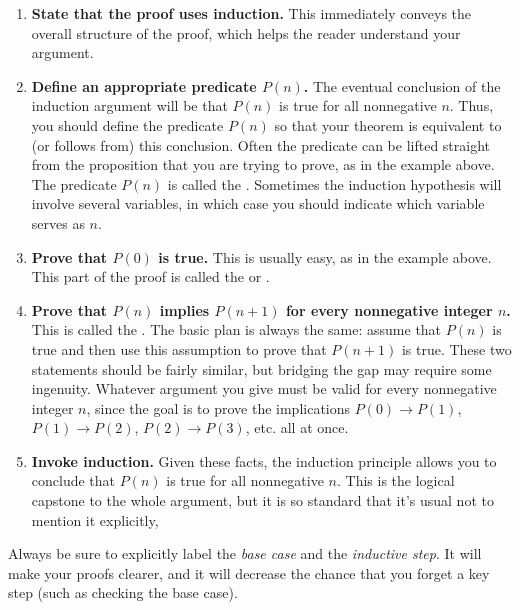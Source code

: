 \begin{enumerate}

\item \textbf{State that the proof uses induction.}  This immediately
conveys the overall structure of the proof, which helps the reader
understand your argument.

\item \textbf{Define an appropriate predicate $P(n)$.}  The eventual
  conclusion of the induction argument will be that $P(n)$ is true for all
  nonnegative $n$.  Thus, you should define the predicate $P(n)$ so that
  your theorem is equivalent to (or follows from) this conclusion.  Often
  the predicate can be lifted straight from the proposition that you
  are trying to prove, as in the example
  above.  The predicate $P(n)$ is called the .
  Sometimes the induction hypothesis will involve several variables, in
  which case you should indicate which variable serves as $n$.

\item \textbf{Prove that $P(0)$ is true.}  This is usually easy, as in the
  example above.  This part of the proof is called the 
  or .\iffalse
  (Sometimes the base case will be $n=1$ or even
  some larger number, in which case the starting value of $n$ also should
  be stated.)\fi


\item \textbf{Prove that $P(n)$ implies $P(n+1)$ for every nonnegative
    integer $n$.}  This is called the .  The basic
  plan is always the same: assume that $P(n)$ is true and then use this
  assumption to prove that $P(n+1)$ is true.  These two statements should
  be fairly similar, but bridging the gap may require some ingenuity.
  Whatever argument you give must be valid for every nonnegative integer
  $n$, since the goal is to prove the implications $P(0) \rightarrow
  P(1)$, $P(1) \rightarrow P(2)$, $P(2) \rightarrow P(3)$, etc. all at
  once.

\item \textbf{Invoke induction.}  Given these facts, the induction
  principle allows you to conclude that $P(n)$ is true for all nonnegative
  $n$.  This is the logical capstone to the whole argument, but it is so
  standard that it's usual not to mention it explicitly,

\end{enumerate}
%
Always be sure to 
explicitly label the \emph{base case} and the \emph{inductive step}.
It will make your proofs clearer, and it will decrease the chance that
you forget a key step (such as checking the base case).


